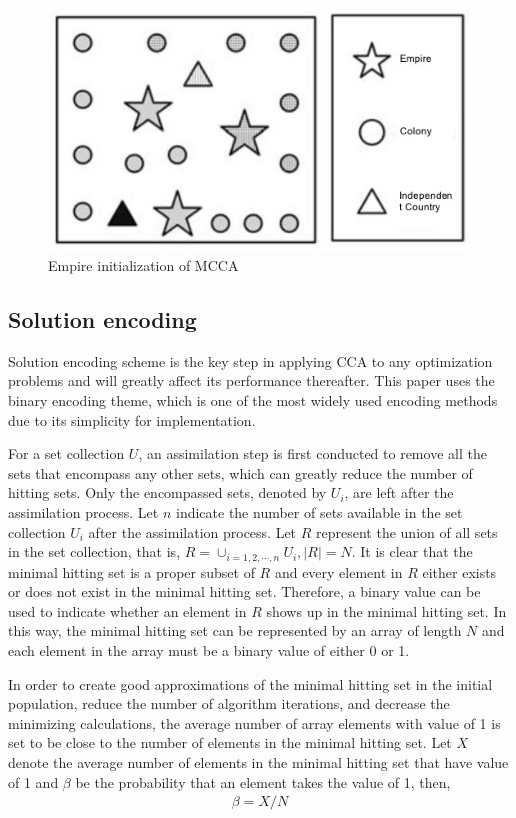 \begin{figure}[h!]
	\begin{center}
		\includegraphics[width=0.5\linewidth]{sections/figure1.jpg}
		\caption{Empire initialization of MCCA}
		\label{fig:fig1}
	\end{center}
\end{figure}


\subsection{Solution encoding}
Solution encoding scheme is the key step in applying CCA to any optimization problems and will greatly affect its performance thereafter.
This paper uses the binary encoding theme, which is one of the most widely used encoding methods due to its simplicity for implementation.

For a set collection $U$, an assimilation step is first conducted to remove all the sets that encompass any other sets, which can greatly reduce the number of hitting sets.
Only the encompassed sets, denoted by $U_i$, are left after the assimilation process. 
Let $n$ indicate the number of sets available in the set collection $U_i$ after the assimilation process.
Let $R$ represent the union of all sets in the set collection, that is, $R = \cup_{i = 1, 2, \cdots, n}U_i, |R| = N$.
It is clear that the minimal hitting set is a proper subset of $R$ and every element in $R$ either exists or does not exist in the minimal hitting set.
Therefore, a binary value can be used to indicate whether an element in $R$ shows up in the minimal hitting set.
In this way, the minimal hitting set can be represented by an array of length $N$ and each element in the array must be a binary value of either 0 or 1.

In order to create good approximations of the minimal hitting set in the initial population, reduce the number of algorithm iterations, and decrease the minimizing calculations, the average number of array elements with value of 1 is set to be close to the number of elements in the minimal hitting set.
Let $X$ denote the average number of elements in the minimal hitting set that have value of 1 and $\beta$ be the probability that an element takes the value of 1, then,
\begin{align}
	\beta = X / N
\end{align}

